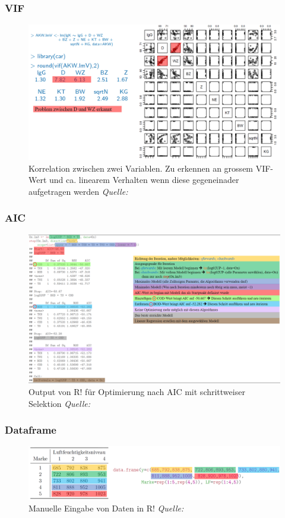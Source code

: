 \subsubsection{VIF}
\label{subsubsec:VIF}
\begin{figure}[!h]
	\centering
	\includegraphics[width=0.9\linewidth]{figures/VIF}
	\caption{Korrelation zwischen zwei Variablen. Zu erkennen an grossem VIF-Wert und ca. linearem Verhalten wenn diese gegeneinader aufgetragen werden \textit{Quelle:} \cite{C:VIF}}
	\label{fig:vif}
\end{figure}

\subsubsection{AIC}
\label{subsubsec:AIC}
\begin{figure}[!h]
	\centering
	\includegraphics[width=1\linewidth]{figures/AIC}
	\caption{Output von R! für Optimierung nach AIC mit schrittweiser Selektion  \textit{Quelle:} \cite{C:AIC}}
	\label{fig:aic}
\end{figure}
\clearpage

\subsubsection{Dataframe}
\label{subsubsec:Dataframe}
\begin{figure}[h!]
	\centering
	\includegraphics[width=0.7\linewidth]{figures/Dataframe}
	\caption{Manuelle Eingabe von Daten in R! \textit{Quelle:}\cite{C:dataframe}}
	\label{fig:dataframe}
\end{figure}
